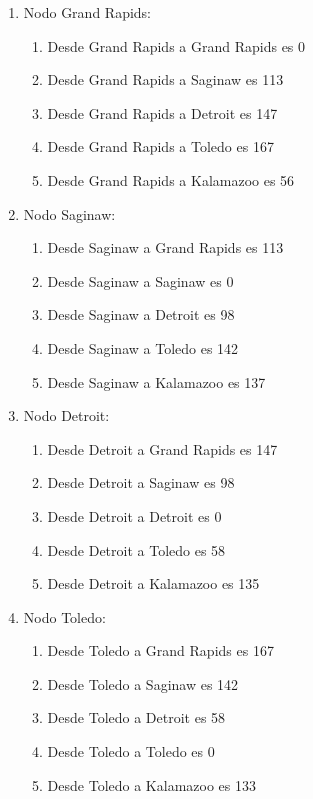 \documentclass{article}
\begin{document}
    \begin{enumerate}
        \item Nodo Grand Rapids:       
            \begin{enumerate}
                \item Desde Grand Rapids a Grand Rapids es 0       
                \item Desde Grand Rapids a Saginaw es 113      
                \item Desde Grand Rapids a Detroit es 147      
                \item Desde Grand Rapids a Toledo es 167       
                \item Desde Grand Rapids a Kalamazoo es 56     
            \end{enumerate}

        \item Nodo Saginaw:     
            \begin{enumerate}
                \item Desde Saginaw a Grand Rapids es 113      
                \item Desde Saginaw a Saginaw es 0      
                \item Desde Saginaw a Detroit es 98      
                \item Desde Saginaw a Toledo es 142       
                \item Desde Saginaw a Kalamazoo es 137 \\     
            \end{enumerate}

        \item Nodo Detroit:      
            \begin{enumerate}
                \item Desde Detroit a Grand Rapids es 147      
                \item Desde Detroit a Saginaw es 98      
                \item Desde Detroit a Detroit es 0     
                \item Desde Detroit a Toledo es 58       
                \item Desde Detroit a Kalamazoo es 135     
            \end{enumerate}

        \item Nodo Toledo:      
            \begin{enumerate}
                \item Desde Toledo a Grand Rapids es 167       
                \item Desde Toledo a Saginaw es 142     
                \item Desde Toledo a Detroit es 58    
                \item Desde Toledo a Toledo es 0       
                \item Desde Toledo a Kalamazoo es 133
            \end{enumerate}


\end{enumerate}
\end{document}

